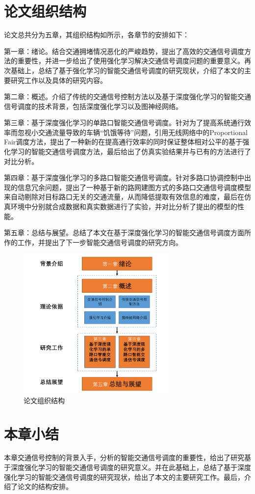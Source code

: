 \section{论文组织结构}
论文总共分为五章，其组织结构如所示，各章节的安排如下：

第一章：绪论。结合交通拥堵情况恶化的严峻趋势，提出了高效的交通信号调度方法的重要性，并进一步给出了使用强化学习解决交通信号调度问题的重要意义。再次基础上，总结了基于强化学习的智能交通信号调度的研究现状，介绍了本文的主要研究工作以及具体的研究内容。

第二章：概述。介绍了传统的交通信号控制方法以及基于深度强化学习的智能交通信号调度的技术背景，包括深度强化学习以及图神经网络。

第三章：基于深度强化学习的单路口智能交通信号调度。针对为了提高系统通行效率而忽视小交通流量导致的车辆“饥饿等待”问题，引用无线网络中的Proportional Fair调度方法，提出了一种新的在提高通行效率的同时保证整体相对公平的基于强化学习的智能交通信号调度方法，最后给出了仿真实验结果并与已有的方法进行了对比分析。

第四章：基于深度强化学习的多路口智能交通信号调度。针对多路口协调控制中出现的信息冗余问题，提出了一种基于新的路网建图方式的多路口交通信号调度模型来自动剔除对目标路口无关的交通流量，从而降低提取有效信息的难度，最后在仿真环境中分别就合成数据和真实数据进行了实验，并对比分析了提出的模型的性能。

第五章：总结与展望。总结了本文在基于深度强化学习的智能交通信号调度方面所作的工作，并提出了下一步智能交通信号调度的研究方向。

\begin{figure}[htb]
    \includegraphics[width=0.7\textwidth]{fig/paper-struct.pdf}
    \caption{论文组织结构}
    \label{fig:paper-struct}
\end{figure}


\section{本章小结}
本章交通信号控制的背景入手，分析的智能交通信号调度的重要性，给出了研究基于深度强化学习的智能交通信号调度的研究意义。并在此基础上，总结了基于深度强化学习的智能交通信号调度的研究现状，给出了本文的主要研究工作。最后，介绍了论文的结构安排。
